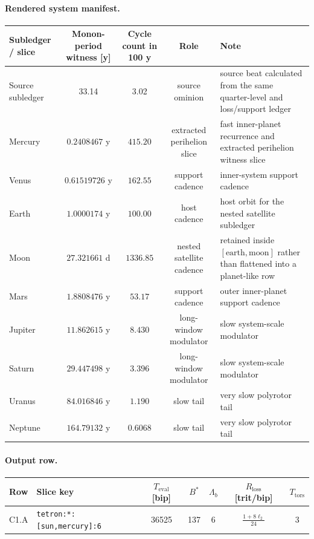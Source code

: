\paragraph{Rendered system manifest.}
\begin{center}
\footnotesize
\begin{tabularx}{\linewidth}{@{}lcccX@{}}
\toprule
Subledger / slice & Monon-period witness [y] & Cycle count in 100 y & Role & Note \\
\midrule
Source subledger & 33.14 & 3.02 & source ominion & source beat calculated from the same quarter-level and loss/support ledger \\
Mercury & $0.2408467$ y & $415.20$ & extracted perihelion slice & fast inner-planet recurrence and extracted perihelion witness slice \\
Venus & $0.61519726$ y & $162.55$ & support cadence & inner-system support cadence \\
Earth & $1.0000174$ y & $100.00$ & host cadence & host orbit for the nested satellite subledger \\
Moon & $27.321661$ d & $1336.85$ & nested satellite cadence & retained inside $[\mathrm{earth},\mathrm{moon}]$ rather than flattened into a planet-like row \\
Mars & $1.8808476$ y & $53.17$ & support cadence & outer inner-planet support cadence \\
Jupiter & $11.862615$ y & $8.430$ & long-window modulator & slow system-scale modulator \\
Saturn & $29.447498$ y & $3.396$ & long-window modulator & slow system-scale modulator \\
Uranus & $84.016846$ y & $1.190$ & slow tail & very slow polyrotor tail \\
Neptune & $164.79132$ y & $0.6068$ & slow tail & very slow polyrotor tail \\
\bottomrule
\end{tabularx}
\end{center}

\paragraph{Output row.}
\begin{center}
\footnotesize
\begin{tabularx}{\linewidth}{@{}lXccccc@{}}
\toprule
Row & Slice key & $T_{\mathrm{eval}}$ [bip] & $B^*$ & $\Lambda_b$ & $R_{\mathrm{loss}}$ [trit/bip] & $T_{\mathrm{tors}}$ \\
\midrule
C1.A & \texttt{tetron:*:[sun,mercury]:6} & 36525 & 137 & 6 & $\frac{1+8\ell_2}{24}$ & 3 \\
\bottomrule
\end{tabularx}
\end{center}


